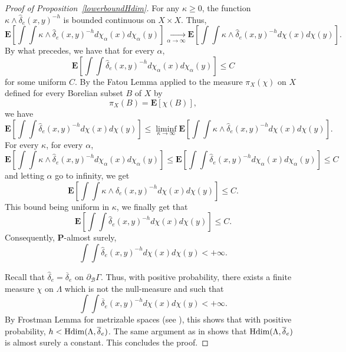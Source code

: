 \documentclass{amsart}
\theoremstyle{definition}
\theoremstyle{remark}
\newcommand{\Hdim}{{\rm Hdim}}
\begin{document}
\begin{proof}[Proof of Proposition~\ref{lowerboundHdim}]
For any $\kappa\geq 0$, the function
$\kappa\wedge \hat{\delta}_e(x,y)^{-h}$
is bounded continuous on $X\times X$.
Thus,
$$\mathbf E\left [\int \int \kappa \wedge \hat{\delta}_e(x,y)^{-h} d\chi_{\alpha}(x)d\chi_{\alpha}(y)\right ]\underset{\alpha\to \infty}{\longrightarrow}\mathbf E\left [\int \int \kappa \wedge \hat{\delta}_e(x,y)^{-h} d\chi(x)d\chi(y)\right ].$$
By what precedes, we have that for every $\alpha$,
$$\mathbf E\left [\int \int \hat{\delta}_e(x,y)^{-h} d\chi_{\alpha}(x)d\chi_{\alpha}(y)\right ]\leq C$$ for some uniform $C$.
By the Fatou Lemma applied to the measure $\pi_X(\chi)$ on $X$ defined for every Borelian subset $B$ of $X$ by
$$\pi_X(B)=\mathbf E[\chi(B)],$$ we have
$$\mathbf E\left [\int \int \hat{\delta}_e(x,y)^{-h} d\chi(x)d\chi(y)\right ]\leq \liminf_{\kappa \to \infty}\mathbf E\left [\int \int \kappa \wedge \hat{\delta}_e(x,y)^{-h} d\chi(x)d\chi(y)\right ].$$
For every $\kappa$, for every $\alpha$,
$$\mathbf E\left [\int \int \kappa \wedge \hat{\delta}_e(x,y)^{-h} d\chi_{\alpha}(x)d\chi_{\alpha}(y)\right ]\leq \mathbf E\left [\int \int \hat{\delta}_e(x,y)^{-h} d\chi_{\alpha}(x)d\chi_{\alpha}(y)\right ]\leq C$$
and letting $\alpha$ go to infinity, we get
$$\mathbf E\left [\int \int \kappa \wedge \hat{\delta}_e(x,y)^{-h} d\chi(x)d\chi(y)\right ]\leq C.$$
This bound being uniform in $\kappa$, we finally get that
$$\mathbf E\left [\int \int \hat{\delta}_e(x,y)^{-h} d\chi(x)d\chi(y)\right ]\leq C.$$
Consequently, $\mathbf P$-almost surely,
$$\int \int \hat{\delta}_e(x,y)^{-h} d\chi(x)d\chi(y)<+\infty.$$

Recall that $\hat{\delta}_e=\overline{\delta}_e$ on $\partial_\mathcal{B}\Gamma$.
Thus, with positive probability, there exists a finite measure $\chi$ on $\Lambda$ which is not the null-measure and such that
$$\int \int \overline{\delta}_e(x,y)^{-h} d\chi(x)d\chi(y)<+\infty.$$
By Frostman Lemma for metrizable spaces (see \cite[Theorem~2.6]{Shah}), this shows that with positive probability, $h<\Hdim(\Lambda,\overline{\delta}_e)$.
The same argument as in \cite[Lemma~4.7]{SWX} shows that $ \Hdim(\Lambda,\overline{\delta}_e)$ is almost surely a constant.
This concludes the proof.
\end{proof}
\end{document}
